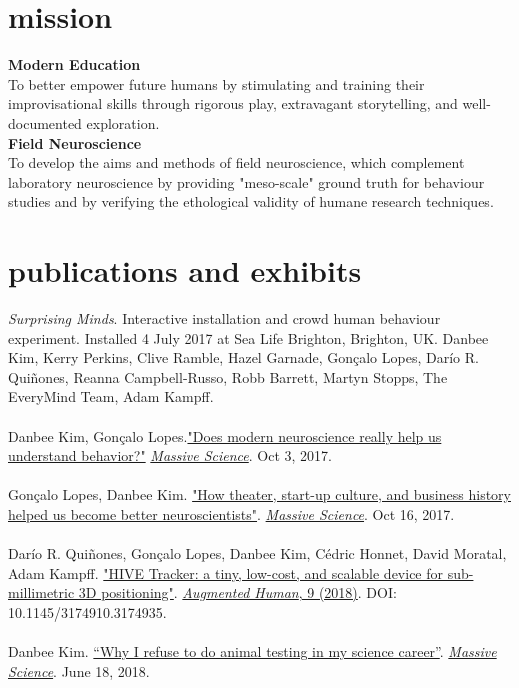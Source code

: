 \documentclass[]{friggeri-cv}
\begin{document}
\section{mission}
\textbf{Modern Education}\\
To better empower future humans by stimulating and training their improvisational skills through rigorous play, extravagant storytelling, and well-documented exploration.\\
\textbf{Field Neuroscience}\\
To develop the aims and methods of field neuroscience, which complement laboratory neuroscience by providing "meso-scale" ground truth for behaviour studies and by verifying the ethological validity of humane research techniques.

\section{publications and exhibits}

\emph{Surprising Minds}. Interactive installation and crowd human behaviour experiment. Installed 4 July 2017 at Sea Life Brighton, Brighton, UK. Danbee Kim, Kerry Perkins, Clive Ramble, Hazel Garnade, Gon\c{c}alo Lopes, Dar\'{i}o R. Qui\~{n}ones, Reanna Campbell-Russo, Robb Barrett, Martyn Stopps, The EveryMind Team, Adam Kampff.\\
\\
Danbee Kim, Gon\c{c}alo Lopes.\href{https://massivesci.com/articles/neuroscience-behavior-vs-technology/}{"Does modern neuroscience really help us understand behavior?"} \emph{\href{https://massivesci.com}{Massive Science}}. Oct 3, 2017. \\
\\
Gon\c{c}alo Lopes, Danbee Kim. \href{https://massivesci.com/articles/neuroscience-can-learn-from-theater/}{"How theater, start-up culture, and business history helped us become better neuroscientists"}. \emph{\href{https://massivesci.com}{Massive Science}}. Oct 16, 2017.\\
\\
Dar\'{i}o R. Qui\~{n}ones, Gon\c{c}alo Lopes, Danbee Kim, C\'{e}dric Honnet, David Moratal, Adam Kampff. \href{https://www.researchgate.net/publication/322842913_HIVE_Tracker_a_tiny_low-cost_and_scalable_device_for_sub-millimetric_3D_positioning}{"HIVE Tracker: a tiny, low-cost, and scalable device for sub-millimetric 3D positioning"}. \href{http://www.sigah.org/AH2018/}{\emph{Augmented Human}, 9 (2018)}. DOI: 10.1145/3174910.3174935.\\
\\
Danbee Kim. \href{https://massivesci.com/articles/frankenstein-kim-animal-testing/}{“Why I refuse to do animal testing in my science career”}. \emph{\href{https://massivesci.com}{Massive Science}}. June 18, 2018.
\end{document}
